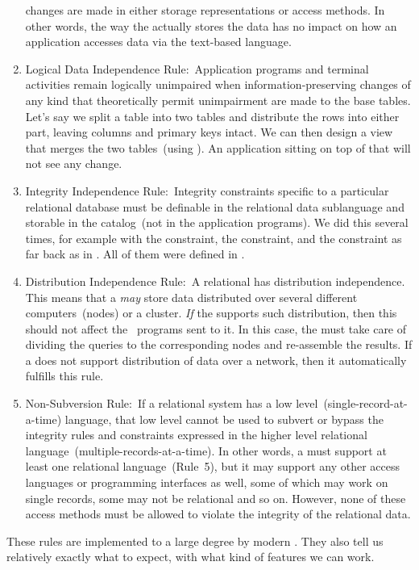 \begin{enumerate}
changes are made in either storage representations or access methods.
In other words, the way the  actually stores the data has no impact on how an application accesses data via the text-based language.%
%
\item Logical Data Independence Rule:~Application programs and terminal activities remain logically unimpaired when information-preserving changes of any kind that theoretically permit unimpairment are made to the base tables.
Let's say we split a table into two tables and distribute the rows into either part, leaving columns and primary keys intact.
We can then design a view that merges the two tables~(using ).
An application sitting on top of that will not see any change.%
%
\item Integrity Independence Rule:~Integrity constraints specific to a particular relational database must be definable in the relational data sublanguage and storable in the catalog~(not in the application programs).
We did this several times, for example with the  constraint, the  constraint, and the  constraint as far back as in .
All of them were defined in \sql.
%
\item Distribution Independence Rule:~A relational  has distribution independence.
This means that a  \emph{may} store data distributed over several different computers~(nodes) or a cluster.
\emph{If} the  supports such distribution, then this should not affect the \sql\ programs sent to it.
In this case, the  must take care of dividing the queries to the corresponding nodes and re-assemble the results.
If a  does not support distribution of data over a network, then it automatically fulfills this rule.%
%
\item Non-Subversion Rule:~If a relational system has a low level~(single-record-at-a-time) language, that low level cannot be used to subvert or bypass the integrity rules and constraints expressed in the higher level relational language~(multiple-records-at-a-time).
In other words, a  must support at least one relational language~(Rule~5), but it may support any other access languages or programming interfaces as well, some of which may work on single records, some may not be relational and so on.
However, none of these access methods must be allowed to violate the integrity of the relational data.%
%
\end{enumerate}%
%
These rules are implemented to a large degree by modern .
They also tell us relatively exactly what to expect, with what kind of features we can work.%
%
\endhsection%
%
